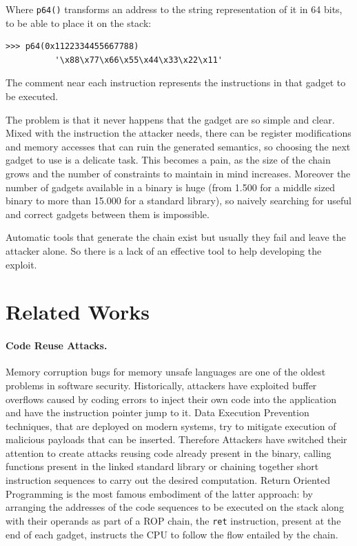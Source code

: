 \documentclass[twocolumn, 11pt]{article}
\begin{document}
\bigskip
Where \texttt{p64()} transforms an address to the string representation of it in 64 bits, to be able to place it on the stack:
\begin{lstlisting}
>>> p64(0x1122334455667788)
          '\x88\x77\x66\x55\x44\x33\x22\x11'
\end{lstlisting}

The comment near each instruction represents the instructions in that gadget to be executed.

\bigskip
The problem is that it never happens that the gadget are so simple and clear. Mixed with the instruction the attacker needs, there can be register modifications and memory accesses that can ruin the generated semantics, so choosing the next gadget to use is a delicate task. This becomes a pain, as the size of the chain grows and the number of constraints to maintain in mind increases.
Moreover the number of gadgets available in a binary is huge (from 1.500 for a middle sized binary to more than 15.000 for a standard library), so naively searching for useful and correct gadgets between them is impossible.

 Automatic tools that generate the chain exist but usually they fail and leave the attacker alone. So there is a lack of an effective tool to help developing the exploit.

\section{Related Works}
\label{se:related}
\paragraph{Code Reuse Attacks.}
Memory corruption bugs for memory unsafe languages are one of the oldest problems in software security. Historically, attackers have exploited buffer overflows caused by coding errors to inject their own code into the application and have the instruction pointer jump to it. Data Execution Prevention techniques, that are deployed on modern systems, try to mitigate execution of malicious payloads that can be inserted. Therefore Attackers have switched their attention to create attacks reusing code already present in the binary, calling functions present in the linked standard library or chaining together short instruction sequences to carry out the desired computation. Return Oriented Programming is the most famous embodiment of the latter approach: by arranging the addresses of the code sequences to be executed on the stack along with their operands as part of a ROP chain, the {\tt ret} instruction, present at the end of each gadget, instructs the CPU to follow the flow entailed by the chain.
\end{document}
